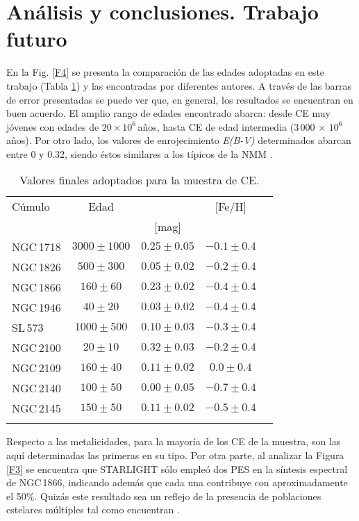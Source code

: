 \documentclass[baaa]{baaa}
\begin{document}
\section{Análisis y conclusiones. Trabajo futuro}

En la Fig. \ref{F4} se presenta la comparación de las edades adoptadas en este trabajo (Tabla \ref{T2}) y las encontradas por diferentes autores. A través de las barras de error presentadas se puede ver que, en general, los resultados se encuentran en buen acuerdo. El amplio rango de edades encontrado abarca: desde CE muy jóvenes con edades de $20\times10^{6}$\,años, hasta CE de edad intermedia ($3\,000\,\times\,10^{6}$ años). Por otro lado, los valores de enrojecimiento {\it {E(B-V)}} determinados abarcan entre 0 y 0.32, siendo éstos similares a los típicos de la NMM \citep{Za2004}.

\begin{table}
\centering
\caption{Valores finales adoptados para la muestra de CE.}
\begin{tabular}{lcccc}
\hline\hline\noalign{\smallskip}
\!\!Cúmulo & \! Edad & \!{\it E(B-V)} & [Fe/H] \\
\!\!& \! [$x 10^{6}$ años] & [mag] & & \\
\hline\noalign{\smallskip}
\!NGC\,1718 & $3000\pm1000$ & $0.25\pm0.05$  &  $-0.1\pm0.4$ \\
\!NGC\,1826 & $500\pm300$   & $0.05\pm0.02$  &  $-0.2\pm0.4$ \\
\!NGC\,1866 & $160\pm60$    & $0.23\pm0.02$  &  $-0.4\pm0.4$ \\
\!NGC\,1946 & $40\pm20$     & $0.03\pm0.02$  &  $-0.4\pm0.4$ \\
\!SL\,573   & $1000\pm500$  & $0.10\pm0.03$  &  $-0.3\pm0.4$ \\
\!NGC\,2100 & $20\pm10$     & $0.32\pm0.03$  &  $-0.2\pm0.4$ \\ 
\!NGC\,2109 & $160\pm40$    & $0.11\pm0.02$  &  $0.0 \pm0.4$ \\ 
\!NGC\,2140 & $100\pm50$    & $0.00\pm0.05$  &  $-0.7\pm0.4$ \\
\!NGC\,2145 & $150\pm50$    & $0.11\pm0.02$  &  $-0.5\pm0.4$ \\ 
\hline
\\
\end{tabular}
\label{T2}
\end{table}


Respecto a las metalicidades, para la mayoría de los CE de la muestra, son las aquí determinadas las primeras en su tipo. Por otra parte, al analizar la Figura \ref{F3} se encuentra que STARLIGHT sólo empleó dos PES en la síntesis espectral de NGC\,1866, indicando además que cada una contribuye con aproximadamente el 50\%. Quizás este resultado sea un reflejo de la presencia de poblaciones estelares múltiples tal como encuentran \citet{Milone2017}.
 
\end{document}
